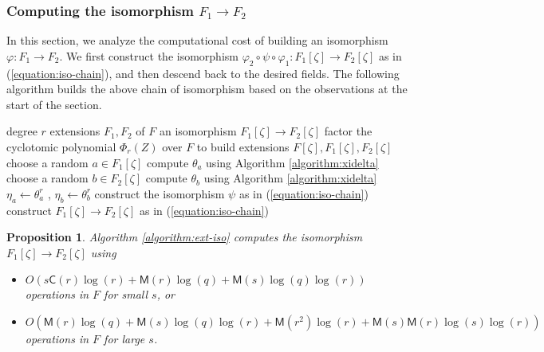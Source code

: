 \documentclass[12pt]{article}
\theoremstyle{plain}
\newtheorem{proposition}[theorem]{Proposition}
\theoremstyle{definition}
\def\MM{\ensuremath{\mathsf{M}}}
\def\CC{\ensuremath{\mathsf{C}}}
\newcounter{algorithm}
\begin{document}

\subsubsection{Computing the isomorphism $F_1 \rightarrow F_2$}

In this section, we analyze the computational cost of building an isomorphism $\varphi: F_1 
\rightarrow F_2$. We first construct the isomorphism $\varphi_2 \circ \psi \circ \varphi_1 : 
F_1[\zeta] \rightarrow F_2[\zeta]$ as in (\ref{equation:iso-chain}), and then descend back to the 
desired fields. The following algorithm builds the above chain of isomorphism based on the 
observations at the start of the section. 
\begin{algorithm}
	\label{algorithm:ext-iso}
	\begin{algorithmic}[1]
		\REQUIRE degree $r$ extensions $F_1, F_2$ of $F$
		\ENSURE an isomorphism $F_1[\zeta] \rightarrow F_2[\zeta]$
		\STATE\label{step:factor-cyclo} factor the cyclotomic polynomial $\Phi_r(Z)$ over $F$ to 
		build extensions $F[\zeta],	F_1[\zeta], F_2[\zeta]$
		\REPEAT
		\STATE choose a random $a \in F_1[\zeta]$
		\STATE compute $\theta_a$ using Algorithm \ref{algorithm:xidelta}
		\REPEAT
		\STATE choose a random $b \in F_2[\zeta]$
		\STATE compute $\theta_b$ using Algorithm \ref{algorithm:xidelta}
		\STATE\label{step:gamma-pow} $\eta_a \leftarrow \theta_a^r$ , $\eta_b \leftarrow \theta_b^r$
		\STATE\label{step:psi} construct the isomorphism $\psi$ as in (\ref{equation:iso-chain})
		\STATE construct $F_1[\zeta] \rightarrow F_2[\zeta]$ as in (\ref{equation:iso-chain})
	\end{algorithmic}
\end{algorithm}
\begin{proposition}
	Algorithm \ref{algorithm:ext-iso} computes the isomorphism $F_1[\zeta] \rightarrow F_2[\zeta]$ 
	using
	\begin{itemize}
		\item $O(s\CC(r)\log(r) + \MM(r)\log(q) + \MM(s)\log(q)\log(r))$\\ operations in $F$ for 
		small $s$, or
		\item $O(\MM(r)\log(q) + \MM(s)\log(q)\log(r) + \MM(r^2)\log(r) +  
		\MM(s)\MM(r)\log(s)\log(r))$\\ 
		operations in $F$ for large $s$.
	\end{itemize}
\end{proposition}
\end{document}
